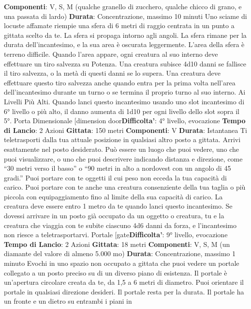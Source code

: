 \begin{multicols}{2}
\textbf{Componenti}: V, S, M (qualche granello di zucchero,
qualche chicco di grano, e una passata di lardo)
\textbf{Durata}: Concentrazione, massimo 10 minuti
Uno sciame di locuste affamate riempie una sfera di 6
metri di raggio centrata in un punto a gittata scelto da
te. La sfera si propaga intorno agli angoli. La sfera
rimane per la durata dell’incantesimo, e la sua area è
oscurata leggermente. L’area della sfera è terreno
difficile.
Quando l’area appare, ogni creatura al suo interno deve
effettuare un tiro salvezza su Potenza. Una
creatura subisce 4d10 danni se fallisce il tiro
salvezza, o la metà di questi danni se lo supera. Una
creatura deve effettuare questo tiro salvezza anche
quando entra per la prima volta nell’area
dell’incantesimo durante un turno o se termina il proprio
turno al suo interno.
Ai Livelli Più Alti. Quando lanci questo incantesimo
usando uno slot incantesimo di 6° livello o più alto, il
danno aumenta di 1d10 per ogni livello dello slot sopra
il 5°.
Porta Dimensionale
[dimension door\textbf{Difficolta'}:
4° livello, evocazione
\textbf{Tempo di Lancio}: 2 Azioni
\textbf{Gittata}: 150 metri
\textbf{Componenti}: V
\textbf{Durata}: Istantanea
Ti teletrasporti dalla tua attuale posizione in qualsiasi
altro posto a gittata. Arrivi esattamente nel posto
desiderato. Può essere un luogo che puoi vedere, uno
che puoi visualizzare, o uno che puoi descrivere
indicando distanza e direzione, come “30 metri verso il
basso” o “90 metri in alto a nordovest con un angolo di
45 gradi.”
Puoi portare con te oggetti il cui peso non ecceda la tua
capacità di carico. Puoi portare con te anche una
creatura consenziente della tua taglia o più piccola con
equipaggiamento fino al limite della sua capacità di
carico. La creatura deve essere entro 1 metro da te
quando lanci questo incantesimo.
Se dovessi arrivare in un posto già occupato da un
oggetto o creatura, tu e la creatura che viaggia con te
subite ciascuno 4d6 danni da forza, e l’incantesimo non
riesce a teletrasportarvi.
Portale
[gate\textbf{Difficolta'}:
9° livello, evocazione
\textbf{Tempo di Lancio}: 2 Azioni
\textbf{Gittata}: 18 metri
\textbf{Componenti}: V, S, M (un diamante del valore di
almeno 5.000 mo)
\textbf{Durata}: Concentrazione, massimo 1 minuto
Evochi in uno spazio non occupato a gittata che puoi
vedere un portale collegato a un posto preciso su di un
diverso piano di esistenza. Il portale è un’apertura
circolare creata da te, da 1,5 a 6 metri di diametro. Puoi
orientare il portale in qualsiasi direzione desideri. Il
portale resta per la durata.
Il portale ha un fronte e un dietro su entrambi i piani in

\end{multicols}
